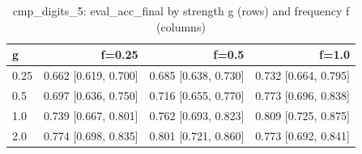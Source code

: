 \begin{table}[t]
\centering
\small
\begin{tabular}{lrrr}
\toprule
g & f=0.25 & f=0.5 & f=1.0 \\
\midrule
0.25 & 0.662 [0.619, 0.700] & 0.685 [0.638, 0.730] & 0.732 [0.664, 0.795] \\
0.5 & 0.697 [0.636, 0.750] & 0.716 [0.655, 0.770] & 0.773 [0.696, 0.838] \\
1.0 & 0.739 [0.667, 0.801] & 0.762 [0.693, 0.823] & 0.809 [0.725, 0.875] \\
2.0 & 0.774 [0.698, 0.835] & 0.801 [0.721, 0.860] & 0.773 [0.692, 0.841] \\
\bottomrule
\end{tabular}
\caption{cmp\_digits\_5: eval\_acc\_final by strength g (rows) and frequency f (columns)}
\label{tab:plasticity_cmp_digits_5_eval_acc_final}
\end{table}